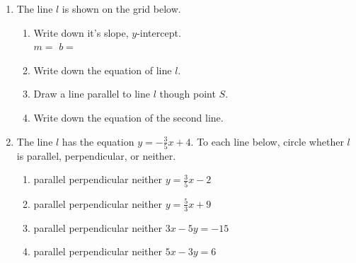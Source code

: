 \begin{enumerate}
\item The line $l$ is shown on the grid below.
\begin{multicols}{2}
\begin{enumerate}
  \item Write down it's slope, $y$-intercept.\\ $m=$
  \hspace{2cm} $b=$
  \vspace{0.25cm}
  \item Write down the equation of line $l$.
  \vspace{1cm}
  \item Draw a line parallel to line $l$ though point $S$.
  \item Write down the equation of the second line.
\end{enumerate}
  \begin{center}
  \end{center}
\end{multicols}\vspace{0.5cm}

\item The line $l$ has the equation $y=-\frac{3}{5}x+4$. To each line below, circle whether $l$ is parallel, perpendicular, or neither.
\begin{enumerate}
  \item parallel \quad perpendicular \quad neither \qquad $y=\frac{3}{5}x-2$
  \vspace{0.5cm}
  \item parallel \quad perpendicular \quad neither \qquad $y=\frac{5}{3}x+9$
  \vspace{0.5cm}
  \item parallel \quad perpendicular \quad neither \qquad $3x-5y=-15$
  \vspace{2cm}
  \item parallel \quad perpendicular \quad neither \qquad $5x-3y=6$
  \vspace{1.5cm}
\end{enumerate}


\end{enumerate}
